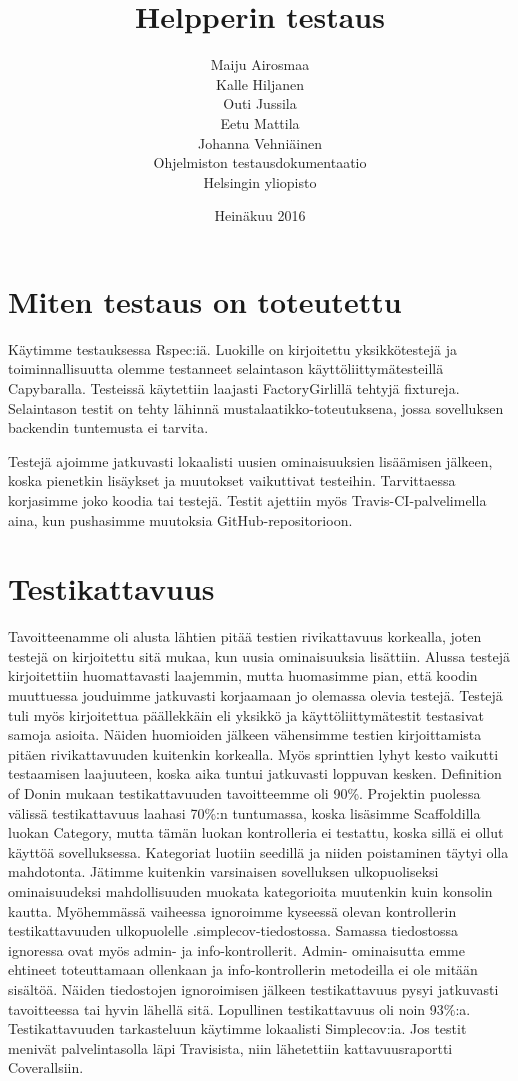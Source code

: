 \documentclass[a4paper,12pt, titlepage]{article}
\title{Helpperin testaus}
\author{ Maiju Airosmaa \\ Kalle Hiljanen \\
Outi Jussila \\ Eetu Mattila \\ Johanna Vehniäinen \\[1cm] Ohjelmiston testausdokumentaatio \\ Helsingin yliopisto}
\date{Heinäkuu 2016}
\begin{document}
\maketitle

\newpage
\tableofcontents
\newpage

\section{Miten testaus on toteutettu}

Käytimme testauksessa Rspec:iä. Luokille on kirjoitettu yksikkötestejä ja toiminnallisuutta olemme testanneet selaintason käyttöliittymätesteillä Capybaralla. Testeissä käytettiin laajasti FactoryGirlillä tehtyjä fixtureja. Selaintason testit on tehty lähinnä mustalaatikko-toteutuksena, jossa sovelluksen backendin tuntemusta ei tarvita.

Testejä ajoimme jatkuvasti lokaalisti uusien ominaisuuksien lisäämisen jälkeen, koska pienetkin lisäykset ja muutokset vaikuttivat testeihin. Tarvittaessa korjasimme joko koodia tai testejä. Testit ajettiin myös Travis-CI-palvelimella aina, kun pushasimme muutoksia GitHub-repositorioon.

\section{Testikattavuus}

Tavoitteenamme oli alusta lähtien pitää testien rivikattavuus korkealla, joten testejä on kirjoitettu sitä mukaa, kun uusia ominaisuuksia lisättiin. Alussa testejä kirjoitettiin huomattavasti laajemmin, mutta huomasimme pian, että koodin muuttuessa jouduimme jatkuvasti korjaamaan jo olemassa olevia testejä. Testejä tuli myös kirjoitettua päällekkäin eli yksikkö ja käyttöliittymätestit testasivat samoja asioita. Näiden huomioiden jälkeen vähensimme testien kirjoittamista pitäen rivikattavuuden kuitenkin korkealla. Myös sprinttien lyhyt kesto vaikutti testaamisen laajuuteen, koska aika tuntui jatkuvasti loppuvan kesken. Definition of Donin mukaan testikattavuuden tavoitteemme oli 90\%. Projektin puolessa välissä testikattavuus laahasi 70\%:n tuntumassa, koska lisäsimme Scaffoldilla luokan Category, mutta tämän luokan kontrolleria ei testattu, koska sillä ei ollut käyttöä sovelluksessa. Kategoriat luotiin seedillä ja niiden poistaminen täytyi olla mahdotonta. Jätimme kuitenkin varsinaisen sovelluksen ulkopuoliseksi ominaisuudeksi mahdollisuuden muokata kategorioita muutenkin kuin konsolin kautta. Myöhemmässä vaiheessa ignoroimme kyseessä olevan kontrollerin testikattavuuden ulkopuolelle .simplecov-tiedostossa. Samassa tiedostossa ignoressa ovat myös admin- ja info-kontrollerit. Admin- ominaisutta emme ehtineet toteuttamaan ollenkaan ja info-kontrollerin metodeilla ei ole mitään sisältöä. Näiden tiedostojen ignoroimisen jälkeen testikattavuus pysyi jatkuvasti tavoitteessa tai hyvin lähellä sitä. Lopullinen testikattavuus oli noin 93\%:a.
Testikattavuuden tarkasteluun käytimme lokaalisti Simplecov:ia. Jos testit menivät palvelintasolla läpi Travisista, niin lähetettiin kattavuusraportti Coverallsiin.
\end{document}
